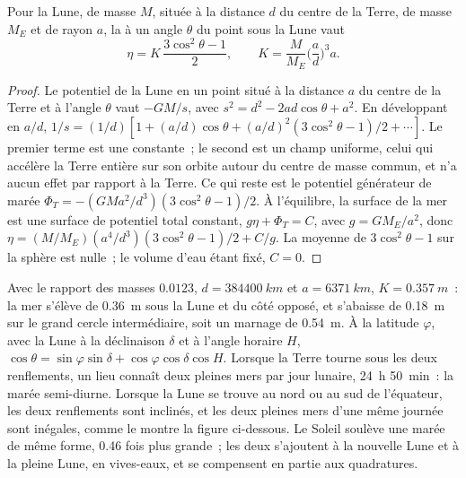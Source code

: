 \begin{theorem}\label{thm:b3:ocean-dynamics:equilibrium-tide}
Pour la Lune, de masse $M$, située à la distance $d$ du centre de la Terre,
de masse $M_E$ et de rayon $a$, la  à un angle $\theta$ du
point sous la Lune vaut
\[
\eta = K\,\frac{3\cos^2\theta - 1}{2},\qquad
K = \frac{M}{M_E}\Big(\frac{a}{d}\Big)^3 a .
\]
\end{theorem}

\begin{proof}
Le potentiel de la Lune en un point situé à la distance $a$ du centre de la
Terre et à l'angle $\theta$ vaut $-GM/s$, avec $s^2 = d^2 - 2ad\cos\theta +
a^2$. En développant en $a/d$, $1/s = (1/d)[1 + (a/d)\cos\theta + (a/d)^2
(3\cos^2\theta - 1)/2 + \cdots]$. Le premier terme est une constante~; le second
est un champ uniforme, celui qui accélère la Terre entière sur son orbite
autour du centre de masse commun, et n'a aucun effet par rapport à la Terre.
Ce qui reste est le potentiel générateur de marée $\Phi_T = -(GMa^2/d^3)(3
\cos^2\theta - 1)/2$. À l'équilibre, la surface de la mer est une surface de
potentiel total constant, $g\eta + \Phi_T = C$, avec $g = GM_E/a^2$, donc
$\eta = (M/M_E)(a^4/d^3)(3\cos^2\theta - 1)/2 + C/g$. La moyenne de
$3\cos^2\theta - 1$ sur la sphère est nulle~; le volume d'eau étant
fixé, $C = 0$.
\end{proof}

Avec le rapport des masses $0.0123$, $d = \qty{384400}{km}$ et $a =
\qty{6371}{km}$, $K = \qty{0.357}{m}$~: la mer s'élève de \qty{0.36}{m}
sous la Lune et du côté opposé, et s'abaisse de \qty{0.18}{m} sur le
grand cercle intermédiaire, soit un marnage de \qty{0.54}{m}. À la latitude $\varphi$, avec
la Lune à la déclinaison $\delta$ et à l'angle horaire $H$, $\cos\theta =
\sin\varphi\sin\delta + \cos\varphi\cos\delta\cos H$. Lorsque la Terre tourne
sous les deux renflements, un lieu connaît deux pleines mers par jour lunaire,
\qty{24}{h} \qty{50}{min}~: la marée semi-diurne. Lorsque la Lune se trouve
au nord ou au sud de l'équateur, les deux renflements sont inclinés, et les deux pleines mers
d'une même journée sont inégales, comme le montre la figure ci-dessous. Le Soleil soulève
une marée de même forme, \num{0.46} fois plus grande~; les deux s'ajoutent à la nouvelle
Lune et à la pleine Lune, en vives-eaux, et se compensent en partie aux quadratures.

